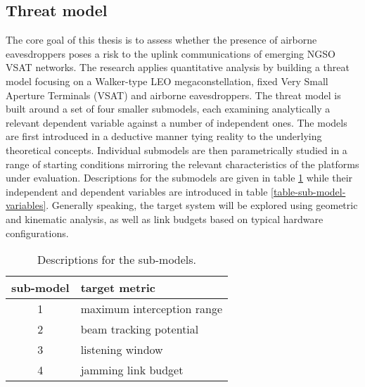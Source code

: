 \documentclass[english, 12pt, a4paper, elec, utf8, a-1b, online]{aaltothesis}
\begin{document}
\subsection{Threat model}
The core goal of this thesis is to assess whether the presence of airborne eavesdroppers poses a risk to the uplink communications of emerging NGSO VSAT networks.
The research applies quantitative analysis by building a threat model focusing on a Walker-type LEO megaconstellation, fixed Very Small Aperture Terminals (VSAT) and airborne eavesdroppers.
The threat model is built around a set of four smaller submodels, each examining analytically a relevant dependent variable against a number of independent ones.
The models are first introduced in a deductive manner tying reality to the underlying theoretical concepts.
Individual submodels are then parametrically studied in a range of starting conditions mirroring the relevant characteristics of the platforms under evaluation.
Descriptions for the submodels are given in table \ref{table-sub-model-descriptions} while their independent and dependent variables are introduced in table \ref{table-sub-model-variables}. Generally speaking, the target system will be explored using geometric and kinematic analysis, as well as link budgets based on typical hardware configurations.






\begin{table}[h]
  \centering
  \caption{Descriptions for the sub-models.}
  \begin{tabular}{@{}cl@{}}
  \toprule
  \multicolumn{1}{l}{sub-model} & target metric              \\ \midrule
  1                             & maximum interception range \\
  2                             & beam tracking potential    \\
  3                             & listening window           \\
  4                             & jamming link budget        \\ \bottomrule
  \end{tabular}
  \label{table-sub-model-descriptions}
\end{table}
\end{document}
